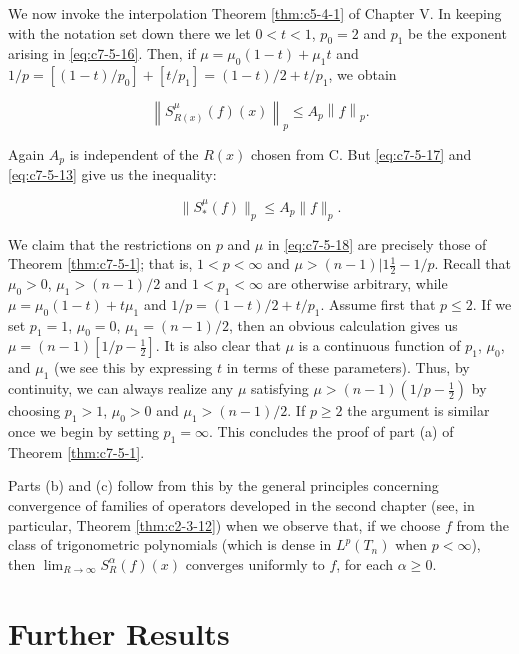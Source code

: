 We now invoke the interpolation Theorem \ref{thm:c5-4-1} of Chapter V. In keeping with the notation set down there we let $0 < t < 1$, $p_0 = 2$ and $p_1$ be the exponent arising in \eqref{eq:c7-5-16}. Then, if $\mu = \mu_0(1 - t) + \mu_1 t$ and $1/p = [(1 - t)/p_0] + [t/p_1] = (1 - t)/2 + t/p_1$, we obtain

\begin{equation}\label{eq:c7-5-17}
\left\|S_{R(x)}^{\mu}(f)(x)\right\|_{p}\leq A_{p}\left\|f\right\|_{p}.
\end{equation}

Again $A_{p}$ is independent of the $R(x)$ chosen from C. But \eqref{eq:c7-5-17} and \eqref{eq:c7-5-13} give us the inequality:

\begin{equation}\label{eq:c7-5-18}
\|S_{*}^{\mu}(f)\|_{p}\leq A_{p}\|f\|_{p}.
\end{equation}

We claim that the restrictions on $p$ and $\mu$ in \eqref{eq:c7-5-18} are precisely those of Theorem \ref{thm:c7-5-1}; that is, $1 < p < \infty$ and $\mu > (n-1)|1\frac{1}{2} - 1/p$. Recall that $\mu_0 > 0$, $\mu_1 > (n-1)/2$ and $1 < p_1 < \infty$ are otherwise arbitrary, while $\mu = \mu_0(1-t) + t\mu_1$ and $1/p = (1-t)/2 + t/p_1$. Assume first that $p \leq 2$. If we set $p_1 = 1$, $\mu_0 = 0$, $\mu_1 = (n-1)/2$, then an obvious calculation gives us $\mu = (n-1)[1/p-\frac{1}{2}]$. It is also clear that $\mu$ is a continuous function of $p_1$, $\mu_0$, and $\mu_1$ (we see this by expressing $t$ in terms of these parameters). Thus, by continuity, we can always realize any $\mu$ satisfying $\mu > (n-1)(1/p-\frac{1}{2})$ by choosing $p_1 > 1$, $\mu_0 > 0$ and $\mu_1 > (n-1)/2$. If $p \geq 2$ the argument is similar once we begin by setting $p_1 = \infty$. This concludes the proof of part (a) of Theorem \ref{thm:c7-5-1}.

Parts (b) and (c) follow from this by the general principles concerning convergence of families of operators developed in the second chapter (see, in particular, Theorem \ref{thm:c2-3-12}) when we observe that, if we choose $f$ from the class of trigonometric polynomials (which is dense in $L^{p}(T_{n})$ when $p < \infty$), then $\lim_{R \to \infty} S_{R}^{\alpha}(f)(x)$ converges uniformly to $f$, for each $\alpha \geq 0$.

\section{Further Results}

